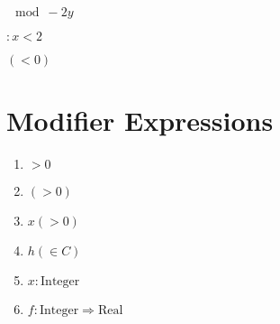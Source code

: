 \documentclass{article}
\begin{document}

$\mod -2y$

$:x<2$

$(<0)$ 

\section{Modifier Expressions}
\begin{enumerate}
  \item $>0$
  \item $(>0)$
  \item $x(>0)$
  \item $h(\in C)$
  \item $x : \mathrm{Integer}$
  \item $f : \mathrm{Integer} \Rightarrow \mathrm{Real}$
\end{enumerate}
\end{document}
